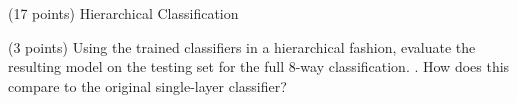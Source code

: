 \documentclass[12pt]{article}
\begin{document}
\begin{question}{(17 points) Hierarchical Classification}
\begin{subquestion}



\end{subquestion}

\begin{subquestion}{(3 points) Using the trained classifiers in a hierarchical fashion, evaluate the resulting model on the testing set for the full 8-way classification. . How does this compare to the original single-layer classifier?}






\end{subquestion}

\end{question}





\clearpage

\end{document}
